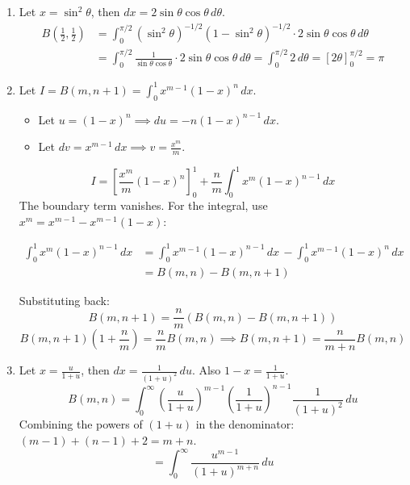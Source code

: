 \begin{solution}
\begin{enumerate}
	\item[(i)] Let $x = \sin^2\theta$, then $dx = 2\sin\theta\cos\theta \, d\theta$.
	\begin{align*}
		B(\tfrac{1}{2}, \tfrac{1}{2}) &= \int_0^{\pi/2} (\sin^2\theta)^{-1/2} (1-\sin^2\theta)^{-1/2} \cdot 2\sin\theta\cos\theta \, d\theta \\
		&= \int_0^{\pi/2} \frac{1}{\sin\theta \cos\theta} \cdot 2\sin\theta\cos\theta \, d\theta = \int_0^{\pi/2} 2 \, d\theta = [2\theta]_0^{\pi/2} = \pi
	\end{align*}

	\item[(ii)] Let $I = B(m, n+1) = \int_0^1 x^{m-1}(1-x)^n \, dx$.
	\begin{itemize}
		\item Let $u = (1-x)^n \implies du = -n(1-x)^{n-1} \, dx$.
		\item Let $dv = x^{m-1} \, dx \implies v = \frac{x^m}{m}$.
	\end{itemize}
	$$ I = \left[ \frac{x^m}{m}(1-x)^n \right]_0^1 + \frac{n}{m} \int_0^1 x^m (1-x)^{n-1} \, dx $$
	The boundary term vanishes. For the integral, use $x^m = x^{m-1} - x^{m-1}(1-x)$:

	\begin{align*}
	\int_0^1 x^m (1-x)^{n-1} \, dx &= \int_0^1 x^{m-1}(1-x)^{n-1} \, dx 
	\, - \int_0^1 x^{m-1}(1-x)^n \, dx \\
	&= B(m,n) - B(m, n+1)
	\end{align*}
    
	Substituting back:
	$$ B(m, n+1) = \frac{n}{m} \left( B(m,n) - B(m, n+1) \right) $$
	$$ B(m, n+1) \left( 1 + \frac{n}{m} \right) = \frac{n}{m} B(m,n) \implies B(m, n+1) = \frac{n}{m+n} B(m,n) $$

	\item[(iii)] Let $x = \frac{u}{1+u}$, then $dx = \frac{1}{(1+u)^2} \, du$. Also $1-x = \frac{1}{1+u}$.
	$$ B(m,n) = \int_0^\infty \left( \frac{u}{1+u} \right)^{m-1} \left( \frac{1}{1+u} \right)^{n-1} \frac{1}{(1+u)^2} \, du $$
	Combining the powers of $(1+u)$ in the denominator: $(m-1) + (n-1) + 2 = m+n$.
	$$ = \int_0^\infty \frac{u^{m-1}}{(1+u)^{m+n}} \, du $$


\end{enumerate}
\end{solution}

